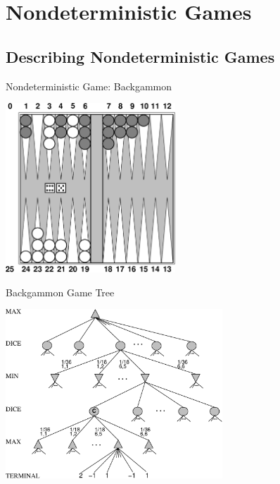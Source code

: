 \documentclass[14pt]{beamer}
\begin{document}
\section{Nondeterministic Games}

\subsection{Describing Nondeterministic Games}
\begin{frame}{Nondeterministic Game: Backgammon}
	\begin{center}
		\includegraphics[height=2.5in]{backgammon-position.pdf}
	\end{center}
\end{frame}
\begin{frame}{Backgammon Game Tree}
	\begin{center}
		\includegraphics[height=2.5in]{backgammon-tree.pdf}
	\end{center}
\end{frame}
\end{document}
